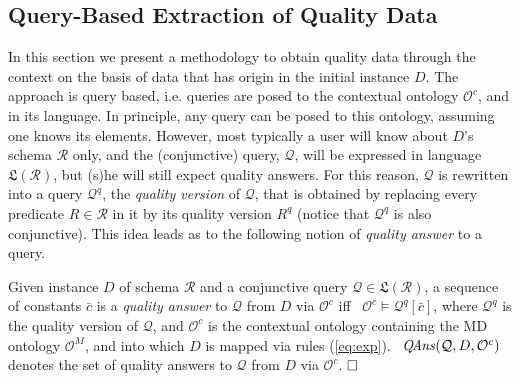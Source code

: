 \documentclass[format=acmsmall, review=false, screen=true]{acmart}
\newcommand{\ignore}[1]{}
\newcommand{\cq}{CQ}
\newcommand{\boxtheorem}{\ensuremath{\hfill \Box}}
\newcommand{\mc}[1]{\mathcal{ #1}}
\newcommand{\mf}[1]{\mathfrak{ #1}}
\newcommand{\nit}[1]{{\it #1}}
\newcommand{\bl}[1]{#1}
\newcommand{\red}[1]{{#1}}
\begin{document}
\subsection{Query-Based Extraction of Quality Data}\label{sec:extrac}



In this section we present a methodology to obtain quality data through the context on the basis of data that has origin in the initial instance $D$. The approach is query based, i.e. queries are posed to the contextual
ontology $\mc{O}^c$, and in its language. In principle, any query can be posed to this ontology, assuming one knows its elements. However, most typically a user will know about $D$'s schema $\mc{R}$ only, and the (conjunctive) query, $\mc{Q}$, will be expressed in  language $\mf{L}(\mc{R})$, but (s)he will still expect quality answers. For this reason, $\mc{Q}$ is rewritten into a query $\mc{Q}^q$, the {\em quality version} of $\mc{Q}$,  that is obtained by replacing
every predicate $R \in \mc{R}$ in it by its quality version $R^q$ (notice that $\mc{Q}^q$ is also conjunctive). This idea leads as to the following notion of {\em quality answer} to a query.


\begin{definition}\label{rm:qqa} Given instance $D$ of schema $\mc{R}$ and a conjunctive query $\mc{Q} \in \mf{L}(\mc{R})$, a sequence of constants $\bar{c}$ is a {\em quality answer} to $\mc{Q}$
from $D$ via $\mc{O}^c$ iff \ $\mc{O}^c \models \mc{Q}^q[\bar{c}]$, where $\mc{Q}^q$ is the quality version of $\mc{Q}$, and $\mc{O}^c$ is the contextual ontology containing the MD ontology $\mc{O}^M$, and into which $D$ is mapped via rules (\ref{eq:exp}). \ $\nit{Q\!Ans}(\mc{Q},D,\mc{O}^c)$ denotes the set of quality answers to $\mc{Q}$ from $D$ via $\mc{O}^c$. \boxtheorem
\end{definition}

\ignore{
\vspace{-4mm}
\begin{align*}\red{
{\it QAns}^{\mf{C}}_D(\mc{Q}) \ =\ \{\bar{c}\;|\; D \cup \Sigma' \cup \mc{M} \cup \bl{E} \cup \Sigma^\mc{P} \cup \Sigma^q  \
\models \ \mc{Q}^q[\bar{c}]\}.}
\end{align*}
\vspace{-4mm}

This formulation of clean answers corresponds to a {\em model-theoretic \red{definition} of clean answers}. Note that in this formulation, $\mc{O}^\mc{M}$ can have multiple models that can only be represented by a canonical model \red{(the chase)} for the purpose of computing certain answers to \cq s.\boxtheorem\end{remark}
}
\end{document}
